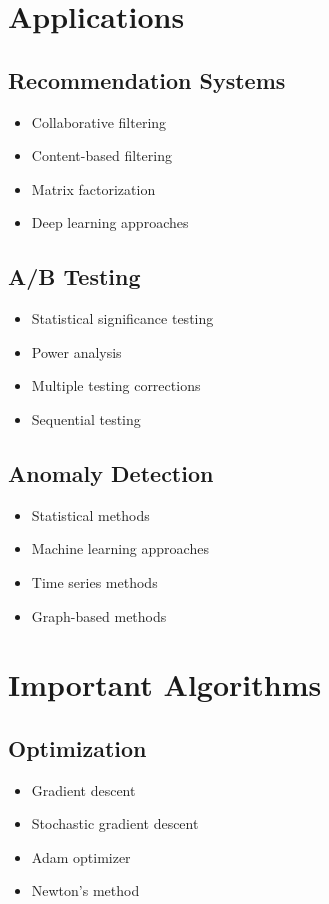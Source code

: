 \documentclass[11pt]{article}
\theoremstyle{definition}
\begin{document}
\section{Applications}

\subsection{Recommendation Systems}
\begin{itemize}
    \item Collaborative filtering
    \item Content-based filtering
    \item Matrix factorization
    \item Deep learning approaches
\end{itemize}

\subsection{A/B Testing}
\begin{itemize}
    \item Statistical significance testing
    \item Power analysis
    \item Multiple testing corrections
    \item Sequential testing
\end{itemize}

\subsection{Anomaly Detection}
\begin{itemize}
    \item Statistical methods
    \item Machine learning approaches
    \item Time series methods
    \item Graph-based methods
\end{itemize}

\section{Important Algorithms}

\subsection{Optimization}
\begin{itemize}
    \item Gradient descent
    \item Stochastic gradient descent
    \item Adam optimizer
    \item Newton's method
\end{itemize}
\end{document}
